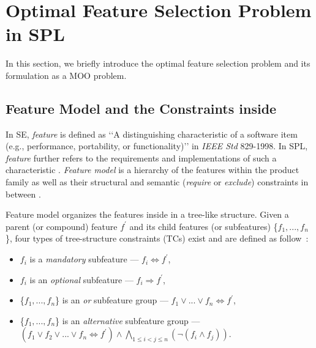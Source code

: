 \section{Optimal Feature Selection Problem in SPL}\label{sec:problem}

In this section, we briefly introduce the optimal feature selection problem  and its formulation as a MOO problem.



\subsection{Feature Model and the Constraints inside}
\label{featuremodel}
In SE, \emph{feature} is defined as \lq\lq{}A distinguishing characteristic of a software item (e.g., performance, portability, or functionality)\rq\rq{} in \emph{IEEE Std} 829-1998.
In SPL,  \emph{feature} further refers to the requirements and implementations of such a characteristic \cite{tr:foda}. \emph{Feature model} is a hierarchy of the features within the product family as well as their structural and semantic (\emph{require} or \emph{exclude}) constraints in between \cite{DBLP:books/daglib/0010411}. %

Feature model organizes the features inside in a tree-like structure. %
Given a parent (or compound) feature $f^\prime$ and its child features (or subfeatures) \{$f_1,...,f_n$\}, four types of tree-structure constraints (TCs) exist and are defined as follow~\cite{DBLP:conf/splc/Batory05}:
 
\begin{itemize}[itemindent=*]
\item  $f_i$ is a \emph{mandatory} subfeature --- $f_i \Leftrightarrow f^\prime$,
\item  $f_i$ is an \emph{optional} subfeature --- $f_i \Rightarrow f^\prime$,
\item  \{$f_1,...,f_n$\} is an \emph{or} subfeature group ---  $f_1 \vee ... \vee f_n\Leftrightarrow f^\prime$,
\item  \{$f_1,...,f_n$\} is an \emph{alternative} subfeature group --- $(f_1 \vee f_2 \vee ... \vee f_n\Leftrightarrow f^\prime)\wedge \bigwedge\limits_{1 \le i<j\le n}(\neg(f_i \wedge f_j))$.
\end{itemize}

